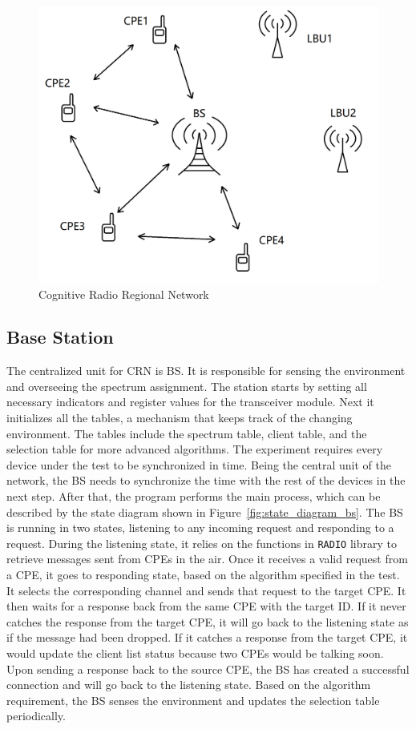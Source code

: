 \begin{figure}[ht]
\centering
\includegraphics[width=12cm]{figures/network.png}
\caption{Cognitive Radio Regional Network}
\label{fig:network}
\end{figure}


\subsection{Base Station}

The centralized unit for CRN is BS. It is responsible for sensing the environment and overseeing the spectrum assignment. The station starts by setting all necessary indicators and register values for the transceiver module. Next it initializes all the tables, a mechanism that keeps track of the changing environment. The tables include the spectrum table, client table, and the selection table for more advanced algorithms. The experiment requires every device under the test to be synchronized in time. Being the central unit of the network, the BS needs to synchronize the time with the rest of the devices in the next step. After that, the program performs the main process, which can be described by the state diagram shown in Figure~\ref{fig:state_diagram_bs}. The BS is running in two states, listening to any incoming request and responding to a request. During the listening state, it relies on the functions in \texttt{RADIO} library to retrieve messages sent from CPEs in the air. Once it receives a valid request from a CPE, it goes to responding state, based on the algorithm specified in the test. It selects the corresponding channel and sends that request to the target CPE. It then waits for a response back from the same CPE with the target ID. If it never catches the response from the target CPE, it will go back to the listening state as if the message had been dropped. If it catches a response from the target CPE, it would update the client list status because two CPEs would be talking soon. Upon sending a response back to the source CPE, the BS has created a successful connection and will go back to the listening state. Based on the algorithm requirement, the BS senses the environment and updates the selection table periodically.

